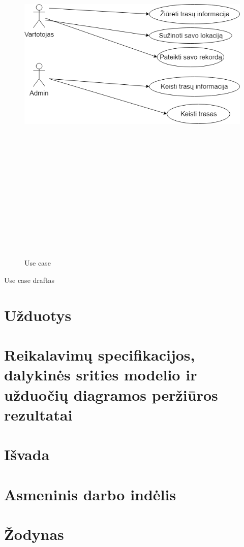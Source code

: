 \documentclass[oneside]{VUMIFPSkursinis}
\begin{document}
\begin{figure}[H]
		\centering	
	\includegraphics[width=18cm,height=20cm,keepaspectratio]{UseCase.png}
	\caption{Use case}
	\label{fig:Use case}
\end{figure}

Use case draftas





 
	

\section{Užduotys}

\section{Reikalavimų specifikacijos, dalykinės srities modelio ir užduočių diagramos peržiūros rezultatai}

\section{Išvada}

\section{Asmeninis darbo indėlis}

\section{Žodynas}


	
	
\end{document}
